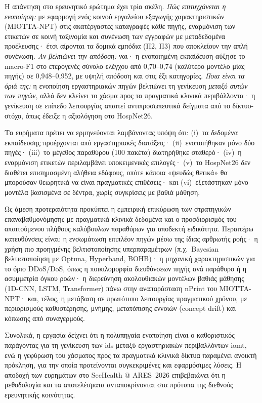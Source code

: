 
Η απάντηση στο ερευνητικό ερώτημα έχει τρία σκέλη. \textit{Πώς επιτυγχάνεται η ενοποίηση:} με εφαρμογή ενός κοινού εργαλείου εξαγωγής χαρακτηριστικών (MIOTTA-NPT) στις ακατέργαστες καταγραφές κάθε πηγής, εναρμόνιση των ετικετών σε κοινή ταξινομία και συνένωση των εγγραφών με μεταδεδομένα προέλευσης· έτσι αίρονται τα δομικά εμπόδια (Π2, Π3) που αποκλείουν την απλή συνένωση. \textit{Αν βελτιώνει την απόδοση:} ναι· η ενοποιημένη εκπαίδευση αύξησε το macro-F1 στο ετερογενές σύνολο ελέγχου από 0,70--0,74 (καλύτερο μοντέλο μίας πηγής) σε 0,948--0,952, με υψηλή απόδοση και στις έξι κατηγορίες. \textit{Ποια είναι τα όριά της:} η ενοποίηση εργαστηριακών πηγών βελτιώνει τη γενίκευση \textit{μεταξύ αυτών των πηγών}, αλλά δεν κλείνει το χάσμα προς τα πραγματικά κλινικά περιβάλλοντα· η γενίκευση σε επίπεδο λειτουργίας απαιτεί αντιπροσωπευτικά δείγματα από το δίκτυο-στόχο, όπως έδειξε η αξιολόγηση στο HospNet26.


Τα ευρήματα πρέπει να ερμηνεύονται λαμβάνοντας υπόψη ότι: (i)~τα δεδομένα εκπαίδευσης προέρχονται από εργαστηριακές διατάξεις· (ii)~ενοποιήθηκαν μόνο δύο πηγές· (iii)~το μέγεθος παραθύρου (100 πακέτα) διατηρήθηκε σταθερό· (iv)~η εναρμόνιση ετικετών περιλαμβάνει υποκειμενικές επιλογές· (v)~το HospNet26 δεν διαθέτει επισημασμένη αλήθεια εδάφους, οπότε κάποια «ψευδώς θετικά» θα μπορούσαν θεωρητικά να είναι πραγματικές επιθέσεις· και (vi)~εξετάστηκαν μόνο μοντέλα βασισμένα σε δέντρα, χωρίς συγκρίσεις με βαθιά μάθηση.


Ως άμεση προτεραιότητα προκύπτει η εμπειρική επικύρωση των στρατηγικών επαναβαθμονόμησης με πραγματικά κλινικά δεδομένα και ο προσδιορισμός του απαιτούμενου πλήθους καλόβουλων παραθύρων για αποδεκτή ειδικότητα. Περαιτέρω κατευθύνσεις είναι: η ενσωμάτωση επιπλέον πηγών μέσω της ίδιας αρθρωτής ροής· η χρήση πιο προηγμένης βελτιστοποίησης υπερπαραμέτρων (π.χ.\ Bayesian βελτιστοποίηση με Optuna, Hyperband, BOHB)· η μηχανική χαρακτηριστικών για το όριο DDoS/DoS, όπως η ποικιλομορφία διευθύνσεων πηγής ανά παράθυρο ή η ασυμμετρία όγκου ροών· η διερεύνηση ακολουθιακών μοντέλων βαθιάς μάθησης (1D-CNN, LSTM, Transformer) πάνω στην αναπαράσταση nPrint του MIOTTA-NPT· και, τέλος, η μετάβαση σε πρωτότυπο λειτουργίας πραγματικού χρόνου, με περιορισμούς καθυστέρησης, μνήμης, μετατόπισης εννοιών (concept drift) και κόπωσης από συναγερμούς.

Συνολικά, η εργασία δείχνει ότι η πολυπηγαία ενοποίηση είναι ο καθοριστικός παράγοντας για τη γενίκευση των \gls{ids} μεταξύ εργαστηριακών περιβαλλόντων \gls{iomt}, ενώ η γεφύρωση του χάσματος προς τα πραγματικά κλινικά δίκτυα παραμένει ανοικτή πρόκληση, για την οποία προτείνονται συγκεκριμένες και εφαρμόσιμες λύσεις. Η αποδοχή των ευρημάτων στο SecHealth @ ARES~2026 επιβεβαιώνει ότι η μεθοδολογία και τα αποτελέσματα ανταποκρίνονται στα πρότυπα της διεθνούς ερευνητικής κοινότητας.
